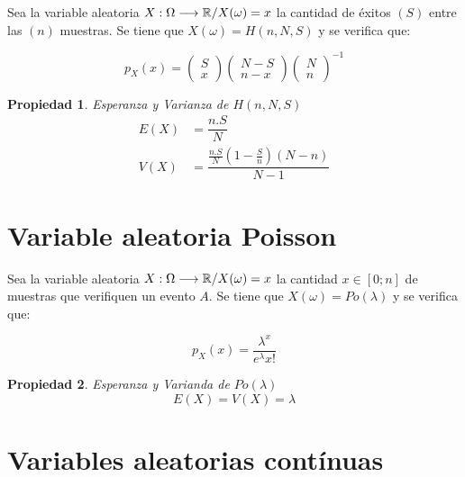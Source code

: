 \documentclass[a5paper,12pt,twoside]{book}
\newtheorem{prop}{{Propiedad}}[chapter]
\begin{document}
Sea la variable aleatoria $X:\Omega \longrightarrow \mathbb{R}/X(\omega)=x$ la cantidad de éxitos $(S)$ entre las $(n)$ muestras. Se tiene que $X(\omega)=H(n,N,S)$ y se verifica que:

\begin{equation}
p_X(x)=
\begin{pmatrix}
S \\ x
\end{pmatrix}
\begin{pmatrix}
N-S \\ n-x
\end{pmatrix}
\begin{pmatrix}
N \\ n
\end{pmatrix}^{-1}
\end{equation}

\begin{prop}
Esperanza y Varianza de $H(n,N,S)$
\begin{equation}
\begin{split}
E(X) &= \dfrac{n.S}{N}
\\
V(X) &= \dfrac{\frac{n.S}{N} \left(1- \frac{S}{n} \right) (N-n)}{N-1}
\end{split}
\end{equation}
\end{prop}

\section{Variable aleatoria Poisson}

Sea la variable aleatoria $X:\Omega \longrightarrow \mathbb{R}/X(\omega)=x$ la cantidad $x \in [0;n]$ de muestras que verifiquen un evento $A$. Se tiene que $X(\omega)=Po(\lambda)$ y se verifica que:

\begin{equation}
p_X(x)=
\dfrac{\lambda^x}{e^\lambda x!}
\end{equation}

\begin{prop}
Esperanza y Varianda de $Po(\lambda)$
\begin{equation}
E(X)=V(X)=\lambda
\end{equation}
\end{prop}


\section{Variables aleatorias contínuas}
\end{document}

